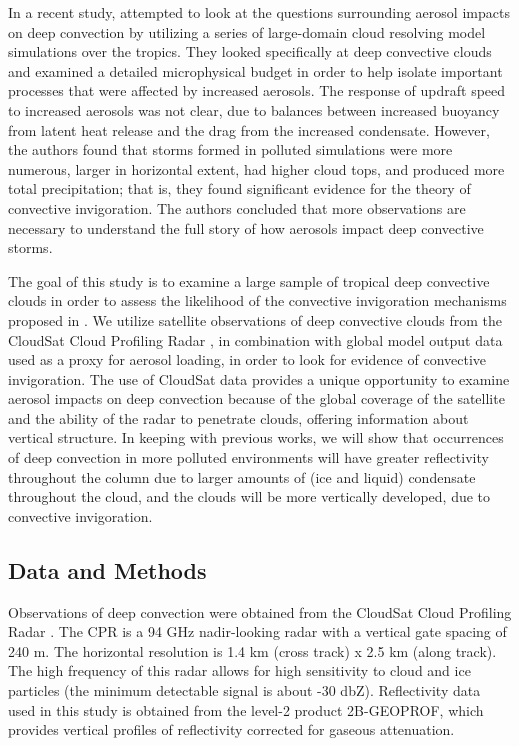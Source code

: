 In a recent study, \citet{rcepaper} attempted to look at the questions surrounding aerosol impacts on deep convection by utilizing a series of large-domain cloud resolving model simulations over the tropics.  They looked specifically at deep convective clouds and examined a detailed microphysical budget in order to help isolate important processes that were affected by increased aerosols.  The response of updraft speed to increased aerosols was not clear, due to balances between increased buoyancy from latent heat release and the drag from the increased condensate.  However, the authors found that storms formed in polluted simulations were more numerous, larger in horizontal extent, had higher cloud tops, and produced more total precipitation; that is, they found significant evidence for the theory of convective invigoration.  The authors concluded that more observations are necessary to understand the full story of how aerosols impact deep convective storms.  

The goal of this study is to examine a large sample of tropical deep convective clouds in order to assess the likelihood of the convective invigoration mechanisms proposed in \citet{rcepaper}.  We utilize satellite observations of deep convective clouds from the CloudSat Cloud Profiling Radar \citep[CPR,][]{Stephens:2002p1094}, in combination with global model output data used as a proxy for aerosol loading, in order to look for evidence of convective invigoration.  The use of CloudSat data provides a unique opportunity to examine aerosol impacts on deep convection because of the global coverage of the satellite and the ability of the radar to penetrate clouds, offering information about vertical structure.  In keeping with previous works, we will show that occurrences of deep convection in more polluted environments will have greater reflectivity throughout the column due to larger amounts of (ice and liquid) condensate throughout the cloud, and the clouds will be more vertically developed, due to convective invigoration.


\subsection{Data and Methods}

Observations of deep convection were obtained from the CloudSat Cloud Profiling Radar \citep[CPR,][]{Stephens:2002p1094}.  The CPR is a 94 GHz nadir-looking radar with a vertical gate spacing of 240 m. The horizontal resolution is 1.4 km (cross track) x 2.5 km (along track). The high frequency of this radar allows for high sensitivity to cloud and ice particles (the minimum detectable signal is about -30 dbZ). Reflectivity data used in this study is obtained from the level-2 product 2B-GEOPROF, which provides vertical profiles of reflectivity corrected for gaseous attenuation.

